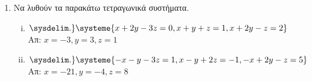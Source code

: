 


\usepackage{systeme}

\pagestyle{vangelis}


\setlength{\itemsep}{\baselineskip}


\begin{center}
\end{center}

\vspace{\baselineskip}

\begin{enumerate}
    \item Να λυθούν τα παρακάτω τετραγωνικά συστήματα.

        \begin{enumerate}[i)]
            \item $ 
            \sysdelim.\}
            \systeme{x + 2y - 3z = 0,
                x + y + z =1,
            x + 2y - z = 2} $ 
            \hfill Απ: $ x=-3, y=3, z=1 $ 

        \item $ 
        \sysdelim.\}
        \systeme{
            -x-y-3z=1,
            x-y+2z=-1,
            -x+2y-z=5
        } $ 
        \hfill Απ: $ x=-21, y=-4, z=8 $ 

\end{enumerate}

\end{enumerate}



